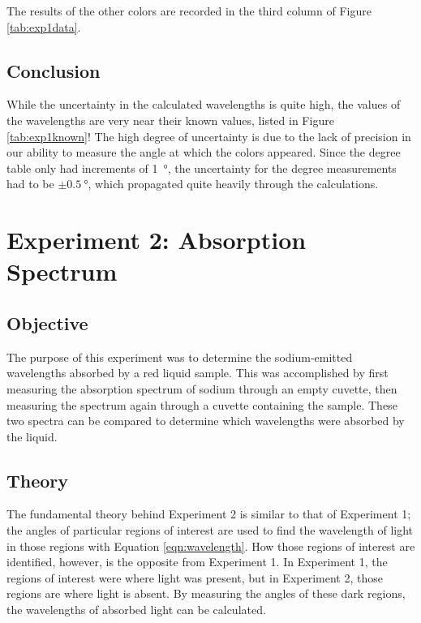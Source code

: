 \documentclass{article}
\begin{document}
\qq The results of the other colors are recorded in the third column of Figure
\ref{tab:exp1data}.  

\subsection{Conclusion}

\qq While the uncertainty in the calculated wavelengths is quite high, the
values of the wavelengths are very near their known values, listed in Figure
\ref{tab:exp1known}! The high degree of uncertainty is due to the lack of
precision in our ability to measure the angle at which the colors
appeared. Since the degree table only had increments of \SI{1}{\degree}, the
uncertainty for the degree measurements had to be \(\pm \SI{0.5}{\degree}\),
which propagated quite heavily through the calculations.


\section{Experiment 2: Absorption Spectrum}


\subsection{Objective}

\qq The purpose of this experiment was to determine the sodium-emitted
wavelengths absorbed by a red liquid sample. This was accomplished by first
measuring the absorption spectrum of sodium through an empty cuvette, then
measuring the spectrum again through a cuvette containing the sample. These two
spectra can be compared to determine which wavelengths were absorbed by the
liquid.

\subsection{Theory}

\qq The fundamental theory behind Experiment 2 is similar to that of Experiment
1; the angles of particular regions of interest are used to find the wavelength
of light in those regions with Equation \ref{eqn:wavelength}. How those regions
of interest are identified, however, is the opposite from Experiment 1. In
Experiment 1, the regions of interest were where light was present, but in
Experiment 2, those regions are where light is absent. By measuring the angles
of these dark regions, the wavelengths of absorbed light can be calculated.
\end{document}
